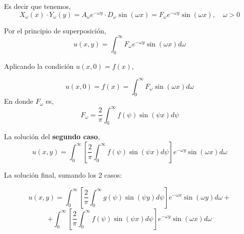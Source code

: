 \begin{solution}
\linea 

Es decir que tenemos,
$$X_\omega(x)\cdot Y_\omega(y)=A_\omega e^{-\omega y}\cdot D_\omega\sin(\omega x)=F_\omega e^{-\omega y}\sin(\omega x), \quad \omega >0$$

\linea 

Por el principio de superposición, 
$$u(x,y)=\int_0^\infty F_\omega e^{-\omega y}\sin(\omega x) d \omega $$

Aplicando la condición $u(x,0)=f(x)$, 

$$u(x,0)=f(x)=\int_0^\infty F_\omega\sin(\omega x) d \omega $$
En donde $F_\omega$ es, 
$$F_\omega= \frac{2}{\pi}\int_0^\infty f(\psi)\sin(\psi x)d\psi $$

\linea 

La solución del \textbf{segundo caso}, 
$$u(x,y)=\int_0^\infty \left[\frac{2}{\pi}\int_0^\infty f(\psi)\sin(\psi x)d\psi\right] e^{-\omega y}\sin(\omega x) d \omega $$

\linea

\linea 

La solución final, sumando los 2 casos:

$$u(x,y)= \int_0^\infty \left[\frac{2}{\pi}\int_0^\infty g(\psi)\sin(\psi y)d\psi\right] e^{-\omega x}\sin(\omega y) d \omega+$$
$$+\int_0^\infty \left[\frac{2}{\pi}\int_0^\infty f(\psi)\sin(\psi x)d\psi\right] e^{-\omega y}\sin(\omega x) d \omega$$

\end{solution}
